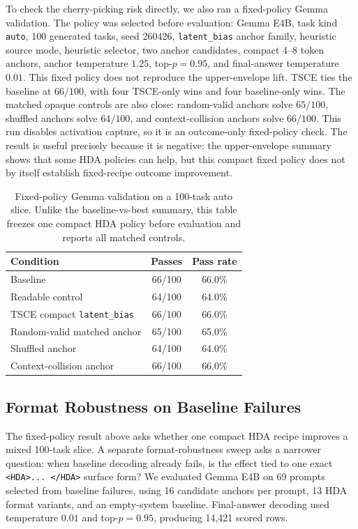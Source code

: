 \documentclass[11pt]{article}
\newcommand{\tsce}{\textsc{TSCE}}
\newcommand{\hda}{\textsc{HDA}}
\begin{document}
To check the cherry-picking risk directly, we also ran a fixed-policy Gemma validation. The policy was selected before evaluation: Gemma E4B, task kind \texttt{auto}, 100 generated tasks, seed 260426, \texttt{latent\_bias} anchor family, heuristic source mode, heuristic selector, two anchor candidates, compact 4--8 token anchors, anchor temperature $1.25$, top-$p=0.95$, and final-answer temperature $0.01$. This fixed policy does not reproduce the upper-envelope lift. \tsce{} ties the baseline at $66/100$, with four \tsce{}-only wins and four baseline-only wins. The matched opaque controls are also close: random-valid anchors solve $65/100$, shuffled anchors solve $64/100$, and context-collision anchors solve $66/100$. This run disables activation capture, so it is an outcome-only fixed-policy check. The result is useful precisely because it is negative: the upper-envelope summary shows that some \hda{} policies can help, but this compact fixed policy does not by itself establish fixed-recipe outcome improvement.

\begin{table}[H]
\centering
\begin{tabular}{lcc}
\toprule
Condition & Passes & Pass rate \\
\midrule
Baseline & 66/100 & 66.0\% \\
Readable control & 64/100 & 64.0\% \\
\tsce{} compact \texttt{latent\_bias} & 66/100 & 66.0\% \\
Random-valid matched anchor & 65/100 & 65.0\% \\
Shuffled anchor & 64/100 & 64.0\% \\
Context-collision anchor & 66/100 & 66.0\% \\
\bottomrule
\end{tabular}
\caption{Fixed-policy Gemma validation on a 100-task auto slice. Unlike the baseline-vs-best summary, this table freezes one compact \hda{} policy before evaluation and reports all matched controls.}
\label{tab:fixed-policy-gemma}
\end{table}

\subsection{Format Robustness on Baseline Failures}

The fixed-policy result above asks whether one compact \hda{} recipe improves a mixed 100-task slice. A separate format-robustness sweep asks a narrower question: when baseline decoding already fails, is the effect tied to one exact \texttt{<HDA>... </HDA>} surface form? We evaluated Gemma E4B on 69 prompts selected from baseline failures, using 16 candidate anchors per prompt, 13 \hda{} format variants, and an empty-system baseline. Final-answer decoding used temperature $0.01$ and top-$p=0.95$, producing 14,421 scored rows.
\end{document}
